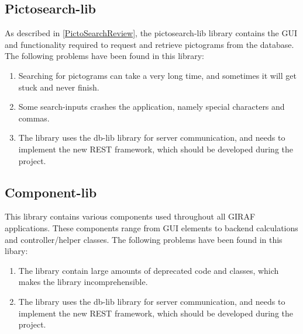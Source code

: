 \subsection{Pictosearch-lib}
As described in \autoref{PictoSearchReview}, the pictosearch-lib library
contains the GUI and functionality required to request and retrieve pictograms
from the database. The following problems have been found in this library:
\begin{enumerate}
  \item Searching for pictograms can take a very long time, and sometimes it
  will get stuck and never finish.
  \item Some search-inputs crashes the application, namely special characters
  and commas.
  \item The library uses the db-lib library for server communication, and needs
  to implement the new REST framework, which should be developed during the project.
\end{enumerate}

\subsection{Component-lib}
This library contains various components used throughout all GIRAF applications.
These components range from GUI elements to backend calculations and
controller/helper classes. The following problems have been found in this
libary:
\begin{enumerate}
  \item The library contain large amounts of deprecated code and classes, which
  makes the library incomprehensible.
  \item The library uses the db-lib library for server communication, and needs
  to implement the new REST framework, which should be developed during the project.
\end{enumerate}